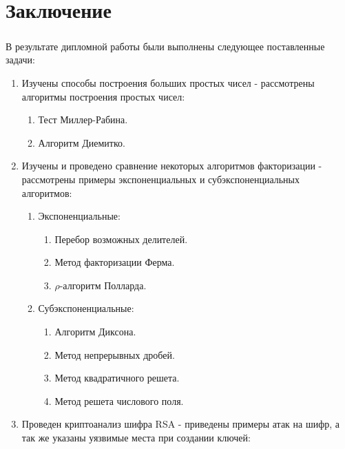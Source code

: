 
\newpage
\chapter*{Заключение}

	\paragraph{} В результате дипломной работы были выполнены следующее поставленные задачи:

	\begin{enumerate}
      \item Изучены способы построения больших простых чисел - рассмотрены алгоритмы построения простых чисел:
      	\begin{enumerate}
      		\item Тест Миллер-Рабина.
      		\item Алгоритм Диемитко.
      	\end{enumerate}
      \item Изучены и проведено сравнение некоторых алгоритмов факторизации - рассмотрены примеры экспоненциальных и субэкспоненциальных алгоритмов:
      	\begin{enumerate}
      		\item Экспоненциальные:
      			\begin{enumerate}
		      		\item Перебор возможных делителей.
		      		\item Метод факторизации Ферма.
		      		\item {$\rho$}-алгоритм Полларда.
		      	\end{enumerate}
      		\item Субэкспоненциальные:
      			\begin{enumerate}
		      		\item Алгоритм Диксона.
		      		\item Метод непрерывных дробей.
		      		\item Метод квадратичного решета.
		      		\item Метод решета числового поля.
		      	\end{enumerate}
      	\end{enumerate}
      \item Проведен криптоанализ шифра RSA - приведены примеры атак на шифр, а так же указаны уязвимые места при создании ключей:

\end{enumerate}
